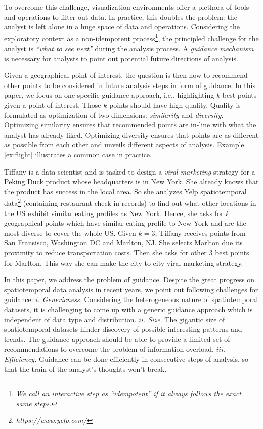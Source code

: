 To overcome this challenge, visualization environments offer a plethora of tools and operations to filter out data. In practice, this doubles the problem: the analyst is left alone in a huge space of data and operations. Considering the exploratory context as a non-idempotent process\footnote{\it We call an interactive step as ``idempotent'' if it always follows the exact same steps.}, the principled challenge for the analyst is {\em ``what to see next''} during the analysis process. A {\em guidance mechanism} is necessary for analysts to point out potential future directions of analysis.

Given a geographical point of interest, the question is then how to recommend other points to be considered in future analysis steps in form of guidance. In this paper, we focus on one specific guidance approach, i.e., highlighting $k$ best points given a point of interest. Those $k$ points should have high quality. Quality is formulated as optimization of two dimensions: {\em similarity} and {\em diversity}. Optimizing similarity ensures that recommended points are in-line with what the analyst has already liked. Optimizing diversity ensures that points are as different as possible from each other and unveils different aspects of analysis. Example \ref{ex:flight} illustrates a common case in practice.

\begin{example}
\label{ex:flight}
Tiffany is a data scientist and is tasked to design a {\em viral marketing} strategy for a Peking Duck product whose headquarters is in New York. She already knows that the product has success in the local area. So she analyzes Yelp spatiotemporal data\footnote{\it https://www.yelp.com/} (containing restaurant check-in records) to find out what other locations in the US exhibit similar eating profiles as New York. Hence, she asks for $k$ geographical points which have similar eating profile to New York and are the most diverse to cover the whole US. Given $k=3$, Tiffany receives points from San Fransisco, Washington DC and Marlton, NJ. She selects Marlton due its proximity to reduce transportation costs. Then she asks for other 3 best points for Marlton. This way she can make the city-to-city viral marketing strategy.
\end{example}

 In this paper, we address the problem of guidance. Despite the great progress on spatiotemporal data analysis in recent years, we point out following challenges for guidance: $i.$ {\em Genericness.} Considering the heterogeneous nature of spatiotemporal datasets, it is challenging to come up with a generic guidance approach which is independent of data type and distribution. $ii.$ {\em Size}. The gigantic size of spatiotemporal datasets hinder discovery of possible interesting patterns and trends. The guidance approach should be able to provide a limited set of recommendations to overcome the problem of information overload. $iii.$ {\em Efficiency.} Guidance can be done efficiently in consecutive steps of analysis, so that the train of the analyst's thoughts won't break.


